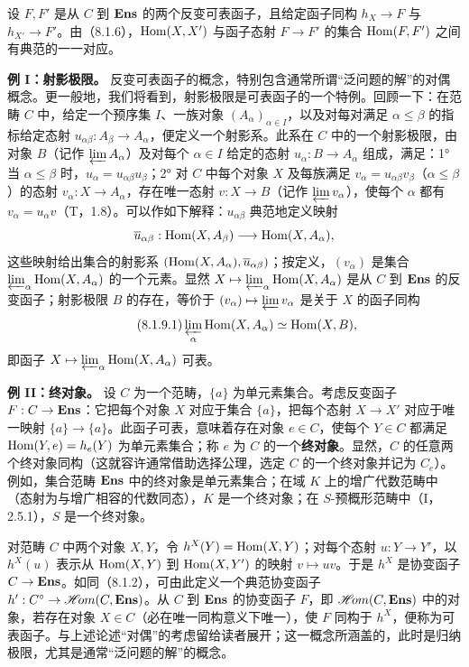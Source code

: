 设 $F,F'$ 是从 $C$ 到 $\mathbf{Ens}$ 的两个反变可表函子，且给定函子同构 $h_X\to F$ 与 $h_{X'}\to F'$。由（8.1.6），$\operatorname{Hom}(X,X')$ 与函子态射 $F\to F'$ 的集合 $\operatorname{Hom}(F,F')$ 之间有典范的一一对应。

\textbf{例 I：射影极限。} 反变可表函子的概念，特别包含通常所谓“泛问题的解”的对偶概念。更一般地，我们将看到，射影极限是可表函子的一个特例。回顾一下：在范畴 $C$ 中，给定一个预序集 $I$、一族对象 $(A_\alpha)_{\alpha\in I}$，以及对每对满足 $\alpha\leq\beta$ 的指标给定态射 $u_{\alpha\beta}:A_\beta\to A_\alpha$，便定义一个射影系。此系在 $C$ 中的一个射影极限，由对象 $B$（记作 $\varprojlim A_\alpha$）及对每个 $\alpha\in I$ 给定的态射 $u_\alpha:B\to A_\alpha$ 组成，满足：1° 当 $\alpha\leq\beta$ 时，$u_\alpha=u_{\alpha\beta}u_\beta$；2° 对 $C$ 中每个对象 $X$ 及每族满足 $v_\alpha=u_{\alpha\beta}v_\beta$（$\alpha\leq\beta$）的态射 $v_\alpha:X\to A_\alpha$，存在唯一态射 $v:X\to B$（记作 $\varprojlim v_\alpha$），使每个 $\alpha$ 都有 $v_\alpha=u_\alpha v$（T，1.8）。可以作如下解释：$u_{\alpha\beta}$ 典范地定义映射
\[
\overline u_{\alpha\beta}:\operatorname{Hom}(X,A_\beta)\longrightarrow\operatorname{Hom}(X,A_\alpha),
\]
这些映射给出集合的射影系 $(\operatorname{Hom}(X,A_\alpha),\overline u_{\alpha\beta})$；按定义，$(v_\alpha)$ 是集合 $\varprojlim_\alpha\operatorname{Hom}(X,A_\alpha)$ 的一个元素。显然 $X\mapsto\varprojlim_\alpha\operatorname{Hom}(X,A_\alpha)$ 是从 $C$ 到 $\mathbf{Ens}$ 的反变函子；射影极限 $B$ 的存在，等价于 $(v_\alpha)\mapsto\varprojlim v_\alpha$ 是关于 $X$ 的函子同构
\begin{equation}\tag{8.1.9.1}
\varprojlim_\alpha\operatorname{Hom}(X,A_\alpha)\simeq\operatorname{Hom}(X,B),
\end{equation}
即函子 $X\mapsto\varprojlim_\alpha\operatorname{Hom}(X,A_\alpha)$ 可表。

\textbf{例 II：终对象。} 设 $C$ 为一个范畴，$\{a\}$ 为单元素集合。考虑反变函子 $F:C\to\mathbf{Ens}$：它把每个对象 $X$ 对应于集合 $\{a\}$，把每个态射 $X\to X'$ 对应于唯一映射 $\{a\}\to\{a\}$。此函子可表，意味着存在对象 $e\in C$，使每个 $Y\in C$ 都满足 $\operatorname{Hom}(Y,e)=h_e(Y)$ 为单元素集合；称 $e$ 为 $C$ 的一个\textbf{终对象}。显然，$C$ 的任意两个终对象同构（这就容许通常借助选择公理，选定 $C$ 的一个终对象并记为 $C_e$）。例如，集合范畴 $\mathbf{Ens}$ 中的终对象是单元素集合；在域 $K$ 上的增广代数范畴中（态射为与增广相容的代数同态），$K$ 是一个终对象；在 $S$-预概形范畴中（I，2.5.1），$S$ 是一个终对象。

对范畴 $C$ 中两个对象 $X,Y$，令 $h^X(Y)=\operatorname{Hom}(X,Y)$；对每个态射 $u:Y\to Y'$，以 $h^X(u)$ 表示从 $\operatorname{Hom}(X,Y)$ 到 $\operatorname{Hom}(X,Y')$ 的映射 $v\mapsto uv$。于是 $h^X$ 是协变函子 $C\to\mathbf{Ens}$。如同（8.1.2），可由此定义一个典范协变函子 $h':C^\circ\to\mathscr{H}\!om(C,\mathbf{Ens})$。从 $C$ 到 $\mathbf{Ens}$ 的协变函子 $F$，即 $\mathscr{H}\!om(C,\mathbf{Ens})$ 中的对象，若存在对象 $X\in C$（必在唯一同构意义下唯一），使 $F$ 同构于 $h^X$，便称为可表函子。与上述论述“对偶”的考虑留给读者展开；这一概念所涵盖的，此时是归纳极限，尤其是通常“泛问题的解”的概念。

